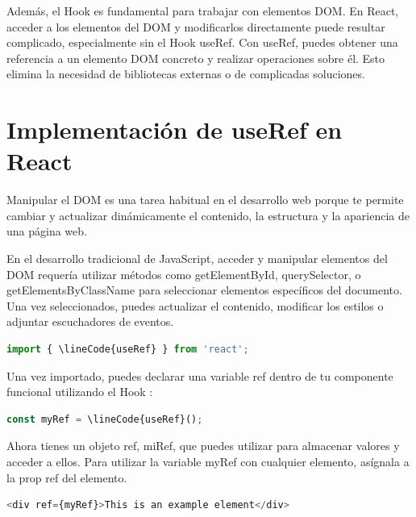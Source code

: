Además, el Hook  es fundamental para trabajar con elementos DOM. En React, acceder a los elementos del DOM y modificarlos directamente puede resultar complicado, especialmente sin el Hook useRef. Con useRef, puedes obtener una referencia a un elemento DOM concreto y realizar operaciones sobre él. Esto elimina la necesidad de bibliotecas externas o de complicadas soluciones.

\section*{Implementación de useRef en React}

Manipular el DOM es una tarea habitual en el desarrollo web porque te permite cambiar y actualizar dinámicamente el contenido, la estructura y la apariencia de una página web.

En el desarrollo tradicional de JavaScript, acceder y manipular elementos del DOM requería utilizar métodos como getElementById, querySelector, o getElementsByClassName para seleccionar elementos específicos del documento. Una vez seleccionados, puedes actualizar el contenido, modificar los estilos o adjuntar escuchadores de eventos.
\vspace{0.2cm} %

\begin{lstlisting}[language=TypeScript, style=mystyle]
  import { \lineCode{useRef} } from 'react';
\end{lstlisting}

Una vez importado, puedes declarar una variable ref dentro de tu componente funcional utilizando el Hook :
\vspace{0.2cm} %

\begin{lstlisting}[language=TypeScript, style=mystyle]
  const myRef = \lineCode{useRef}();
\end{lstlisting}

Ahora tienes un objeto ref, miRef, que puedes utilizar para almacenar valores y acceder a ellos. Para utilizar la variable myRef con cualquier elemento, asígnala a la prop ref del elemento.
\vspace{0.2cm} %

\begin{lstlisting}[language=TypeScript, style=mystyle]
  <div ref={myRef}>This is an example element</div>
\end{lstlisting}


